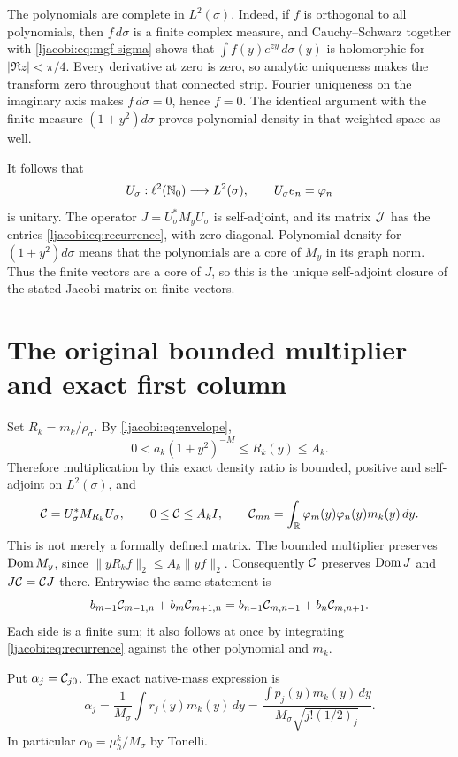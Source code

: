 \documentclass[11pt]{article}
\begin{document}
The polynomials are complete in $L^2(\sigma)$. Indeed, if $f$ is
orthogonal to all polynomials, then $f\,d\sigma$ is a finite complex
measure, and Cauchy--Schwarz together with
\eqref{ljacobi:eq:mgf-sigma} shows that
$\int f(y)e^{zy}\,d\sigma(y)$ is holomorphic for $|\Re z|<\pi/4$.
Every derivative at zero is zero, so analytic uniqueness makes
the transform zero throughout that connected strip. Fourier
uniqueness on the imaginary axis makes $f\,d\sigma=0$, hence $f=0$.
The identical argument with the finite measure $(1+y^2)d\sigma$
proves polynomial density in that weighted space as well.

It follows that
\[
 U_\sigma:\ell^2(\mathbb N_0)\longrightarrow L^2(\sigma),\qquad
 U_\sigma e_n=\varphi_n
\]
is unitary. The operator $J=U_\sigma^*M_yU_\sigma$ is self-adjoint,
and its matrix $\mathcal J$ has the entries \eqref{ljacobi:eq:recurrence}, with zero
diagonal. Polynomial density for $(1+y^2)d\sigma$ means that the
polynomials are a core of $M_y$ in its graph norm. Thus the finite
vectors are a core of $J$, so this is the unique self-adjoint closure
of the stated Jacobi matrix on finite vectors.

\section{The original bounded multiplier and exact first column}

Set $R_k=m_k/\rho_\sigma$. By \eqref{ljacobi:eq:envelope},
\[
 0<a_k(1+y^2)^{-M}\leq R_k(y)\leq A_k.
\]
Therefore multiplication by this exact density ratio is bounded,
positive and self-adjoint on $L^2(\sigma)$, and
\begin{equation}\label{ljacobi:eq:operator}
 \mathcal C=U_\sigma^*M_{R_k}U_\sigma,\qquad
 0\leq\mathcal C\leq A_k I,\qquad
 \mathcal C_{mn}=\int_\mathbb R\varphi_m(y)\varphi_n(y)m_k(y)\,dy.
\end{equation}
This is not merely a formally defined matrix. The bounded multiplier
preserves $\operatorname{Dom} M_y$, since
$\|yR_k f\|_2\leq A_k\|yf\|_2$. Consequently $\mathcal C$ preserves
$\operatorname{Dom} J$ and $J\mathcal C=\mathcal C J$ there. Entrywise the same statement is
\[
 b_{m-1}\mathcal C_{m-1,n}+b_m\mathcal C_{m+1,n}
 =b_{n-1}\mathcal C_{m,n-1}+b_n\mathcal C_{m,n+1}.
\]
Each side is a finite sum; it also follows at once by integrating
\eqref{ljacobi:eq:recurrence} against the other polynomial and $m_k$.

Put $\alpha_j=\mathcal C_{j0}$. The exact native-mass expression is
\begin{equation}\label{ljacobi:eq:alpha-moment}
 \alpha_j=\frac1{M_\sigma}\int r_j(y)m_k(y)\,dy
 =\frac{\int p_j(y)m_k(y)\,dy}
             {M_\sigma\sqrt{j!(1/2)_j}}.
\end{equation}
In particular $\alpha_0=\mu_h^k/M_\sigma$ by Tonelli.
\end{document}

